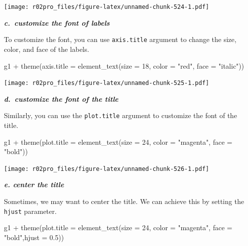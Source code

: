 \documentclass[
]{book}
\newenvironment{Shaded}{\begin{snugshade}}{\end{snugshade}}
\newcommand{\AttributeTok}[1]{\textcolor[rgb]{0.77,0.63,0.00}{#1}}
\newcommand{\DecValTok}[1]{\textcolor[rgb]{0.00,0.00,0.81}{#1}}
\newcommand{\FloatTok}[1]{\textcolor[rgb]{0.00,0.00,0.81}{#1}}
\newcommand{\FunctionTok}[1]{\textcolor[rgb]{0.00,0.00,0.00}{#1}}
\newcommand{\NormalTok}[1]{#1}
\newcommand{\SpecialCharTok}[1]{\textcolor[rgb]{0.00,0.00,0.00}{#1}}
\newcommand{\StringTok}[1]{\textcolor[rgb]{0.31,0.60,0.02}{#1}}
\begin{document}
\texttt{[image: r02pro\_files/figure-latex/unnamed-chunk-524-1.pdf]}

\textbf{\emph{c.~customize the font of labels}}

To customize the font, you can use \texttt{axis.title} argument to change the size, color, and face of the labels.

\begin{Shaded}
\begin{Highlighting}[]
\NormalTok{g1 }\SpecialCharTok{+} \FunctionTok{theme}\NormalTok{(}\AttributeTok{axis.title =} \FunctionTok{element\_text}\NormalTok{(}\AttributeTok{size =} \DecValTok{18}\NormalTok{, }\AttributeTok{color =} \StringTok{"red"}\NormalTok{, }\AttributeTok{face =} \StringTok{"italic"}\NormalTok{))}
\end{Highlighting}
\end{Shaded}

\texttt{[image: r02pro\_files/figure-latex/unnamed-chunk-525-1.pdf]}

\textbf{\emph{d.~customize the font of the title}}

Similarly, you can use the \texttt{plot.title} argument to customize the font of the title.

\begin{Shaded}
\begin{Highlighting}[]
\NormalTok{g1 }\SpecialCharTok{+} \FunctionTok{theme}\NormalTok{(}\AttributeTok{plot.title =} \FunctionTok{element\_text}\NormalTok{(}\AttributeTok{size =} \DecValTok{24}\NormalTok{, }\AttributeTok{color =} \StringTok{"magenta"}\NormalTok{, }\AttributeTok{face =} \StringTok{"bold"}\NormalTok{))}
\end{Highlighting}
\end{Shaded}

\texttt{[image: r02pro\_files/figure-latex/unnamed-chunk-526-1.pdf]}

\textbf{\emph{e. center the title}}

Sometimes, we may want to center the title. We can achieve this by setting the \texttt{hjust} parameter.

\begin{Shaded}
\begin{Highlighting}[]
\NormalTok{g1 }\SpecialCharTok{+} \FunctionTok{theme}\NormalTok{(}\AttributeTok{plot.title =} \FunctionTok{element\_text}\NormalTok{(}\AttributeTok{size =} \DecValTok{24}\NormalTok{, }\AttributeTok{color =} \StringTok{"magenta"}\NormalTok{, }\AttributeTok{face =} \StringTok{"bold"}\NormalTok{,}\AttributeTok{hjust =} \FloatTok{0.5}\NormalTok{)) }
\end{Highlighting}
\end{Shaded}
\end{document}
